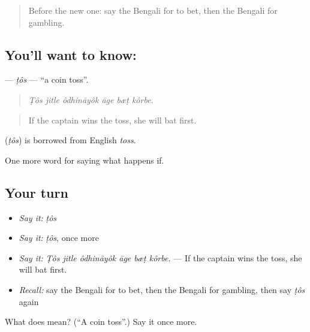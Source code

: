 \begin{quote}
Before the new one: say the Bengali for to bet, then the Bengali for gambling.
\end{quote}

\subsection*{You'll want to know: }
\textbf{} — \emph{ṭôs} — \textquotedblleft{}a coin toss\textquotedblright{}.

\begin{quote}
     
\end{quote}

\begin{quote}
\emph{Ṭôs jitle ôdhināyôk āge bæṭ kôrbe.}
\end{quote}

\begin{quote}
If the captain wins the toss, she will bat first.
\end{quote}

\begin{cousinweb}
\textbf{} (\emph{ṭôs}) is borrowed from English \emph{toss}.
\end{cousinweb}

\begin{grammarlens}[title={What you've built}]
One more word for saying what happens if.
\end{grammarlens}

\subsection*{Your turn}
\begin{itemize}
\raggedright
  \item \emph{Say it:} \emph{ṭôs}
  \item \emph{Say it:} \emph{ṭôs}, once more
  \item \emph{Say it:} \emph{Ṭôs jitle ôdhināyôk āge bæṭ kôrbe.} — If the captain wins the toss, she will bat first.
  \item \emph{Recall:} say the Bengali for to bet, then the Bengali for gambling, then say \emph{ṭôs} again
\end{itemize}

\begin{tcolorbox}[breakable,colback=teal!4,colframe=teal!35!black,title={Before you move on}]
What does  mean? (\textquotedblleft{}A coin toss\textquotedblright{}.) Say it once more.
\end{tcolorbox}
